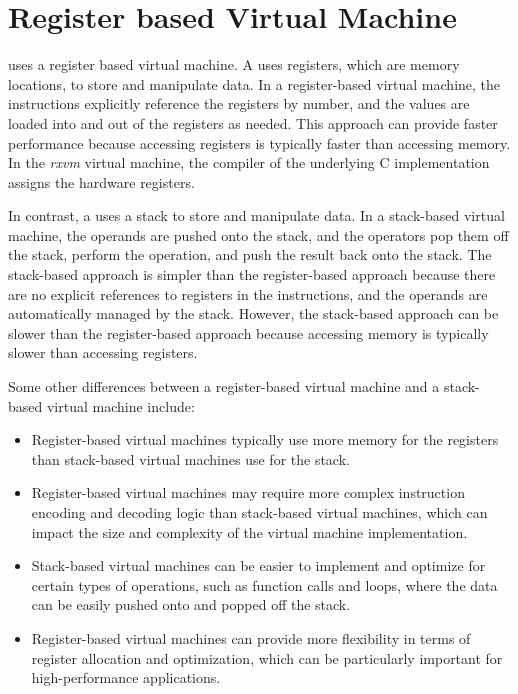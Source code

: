 \section{Register based Virtual Machine}
\crexx{} uses a register based virtual machine.
A  uses registers, which are memory locations, to store and manipulate data. In a register-based virtual machine, the instructions explicitly reference the registers by number, and the values are loaded into and out of the registers as needed. This approach can provide faster performance because accessing registers is typically faster than accessing memory. In the \emph{rxvm} virtual machine, the compiler of the underlying C implementation assigns the hardware registers.

In contrast, a  uses a stack to store and manipulate data. In a stack-based virtual machine, the operands are pushed onto the stack, and the operators pop them off the stack, perform the operation, and push the result back onto the stack. The stack-based approach is simpler than the register-based approach because there are no explicit references to registers in the instructions, and the operands are automatically managed by the stack. However, the stack-based approach can be slower than the register-based approach because accessing memory is typically slower than accessing registers.

Some other differences between a register-based virtual machine and a stack-based virtual machine include:
\begin{itemize}
\item Register-based virtual machines typically use more memory for the registers than stack-based virtual machines use for the stack.
\item Register-based virtual machines may require more complex instruction encoding and decoding logic than stack-based virtual machines, which can impact the size and complexity of the virtual machine implementation.
\item Stack-based virtual machines can be easier to implement and optimize for certain types of operations, such as function calls and loops, where the data can be easily pushed onto and popped off the stack.
\item Register-based virtual machines can provide more flexibility in terms of register allocation and optimization, which can be particularly important for high-performance applications.
\end{itemize}

